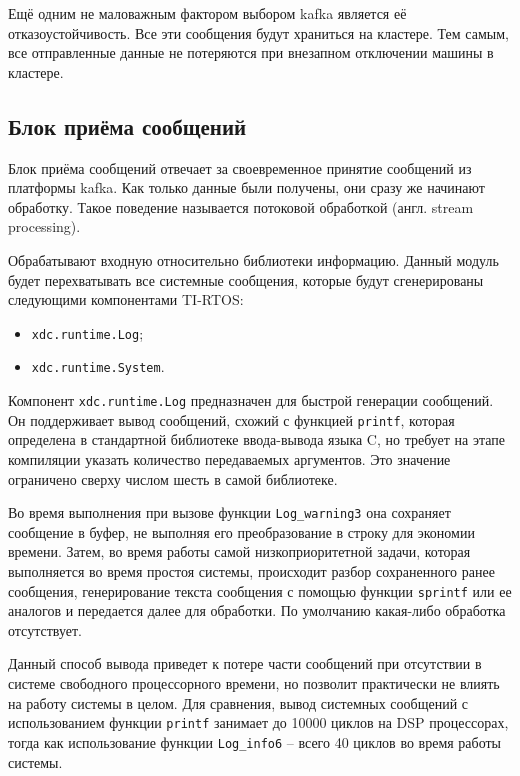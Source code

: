 Ещё одним не маловажным фактором выбором kafka является её отказоустойчивость.
Все эти сообщения будут храниться на кластере.
Тем самым, все отправленные данные не потеряются при внезапном отключении машины в кластере.


\subsection{Блок приёма сообщений}

Блок приёма сообщений отвечает за своевременное принятие сообщений из платформы kafka.
Как только данные были получены, они сразу же начинают обработку.
Такое поведение называется потоковой обработкой (англ. stream processing).




Обрабатывают входную относительно библиотеки информацию. Данный модуль
будет перехватывать все системные сообщения, которые будут сгенерированы
следующими компонентами TI-RTOS:
\begin{itemize}
    \item \texttt{xdc.runtime.Log};
    \item \texttt{xdc.runtime.System}.
\end{itemize}

Компонент \texttt{xdc.runtime.Log} предназначен для быстрой генерации сообщений.
Он поддерживает вывод сообщений, схожий с функцией \texttt{printf}, которая
определена в стандартной библиотеке ввода-вывода языка C,
но требует на этапе компиляции указать количество передаваемых аргументов.
Это значение ограничено сверху числом шесть в самой библиотеке.

Во время выполнения при вызове функции \texttt{Log\_warning3} она сохраняет
сообщение в буфер, не выполняя его преобразование в строку для экономии времени.
Затем, во время работы самой низкоприоритетной задачи, которая выполняется
во время простоя системы, происходит разбор сохраненного ранее сообщения,
генерирование текста сообщения с помощью функции \texttt{sprintf} или ее аналогов
и передается далее для обработки. По умолчанию какая-либо обработка отсутствует.

Данный способ вывода приведет к потере части сообщений при отсутствии в системе
свободного процессорного времени, но позволит практически не влиять на работу
системы в целом. Для сравнения, вывод системных сообщений с использованием
функции \texttt{printf} занимает до \num{10000} циклов на DSP процессорах,
тогда как использование функции \texttt{Log\_info6} -- всего
\num{40} циклов во время работы системы.

